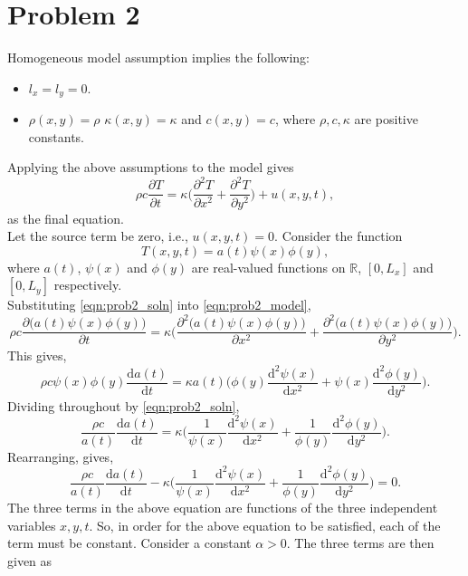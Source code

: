 \documentclass[12pt]{article}
\newcommand{\parder}[2]{\frac{\partial #1}{\partial #2}}
\newcommand{\der}[2]{\frac{\mathrm{d} #1}{\mathrm{d} #2}}
\begin{document}
\section*{Problem 2}
Homogeneous model assumption implies the following:
\begin{itemize}
	\item $l_x = l_y = 0$.
	\item $\rho(x,y) = \rho$ $\kappa(x,y) = \kappa$ and $c(x,y) = c$, where $\rho, c, \kappa$ are positive constants.
\end{itemize}
Applying the above assumptions to the model gives
\begin{equation}
\rho c \parder{T}{t} = \kappa \bigg(\parder{^2 T}{x^2} + \parder{^2 T}{y^2}\bigg) + u(x,y,t),
\label{eqn:prob2_model}
\end{equation}
as the final equation. \\
Let the source term be zero, i.e., $u(x,y,t) = 0$. Consider the function 
\begin{equation}
T(x,y,t) = a(t)\psi(x)\phi(y),
\label{eqn:prob2_soln}
\end{equation}
where $a(t)$, $\psi(x)$ and $\phi(y)$ are real-valued functions on $\mathbb{R}$, $[0,L_x]$ and $[0,L_y]$ respectively. \\
Substituting \eqref{eqn:prob2_soln} into \eqref{eqn:prob2_model},
\begin{equation}
\rho c \parder{\big(a(t)\psi(x)\phi(y)\big)}{t} = \kappa \bigg(\parder{^2 \big(a(t)\psi(x)\phi(y)\big)}{x^2} + \parder{^2 \big(a(t)\psi(x)\phi(y)\big)}{y^2}\bigg).
\end{equation}
This gives,   
\begin{equation}
\rho c \psi(x) \phi(y) \der{a(t)}{t} = \kappa a(t)\bigg(\phi(y)\der{^2 \psi(x)}{x^2} + \psi(x)\der{^2 \phi(y)}{y^2}\bigg).
\end{equation}
Dividing throughout by \eqref{eqn:prob2_soln}, 
\begin{equation}
\frac{\rho c}{a(t)} \der{a(t)}{t} = \kappa \bigg(\frac{1}{\psi(x)}\der{^2 \psi(x)}{x^2} + \frac{1}{\phi(y)}\der{^2 \phi(y)}{y^2}\bigg).
\end{equation}
Rearranging, gives,
\begin{equation}
\frac{\rho c}{a(t)} \der{a(t)}{t} - \kappa \bigg(\frac{1}{\psi(x)}\der{^2 \psi(x)}{x^2} + \frac{1}{\phi(y)}\der{^2 \phi(y)}{y^2}\bigg) = 0.
\end{equation}
The three terms in the above equation are functions of the three independent variables $x, y, t$. So, in order for the above equation to be satisfied, each of the term must be constant. Consider a constant $\alpha > 0$. The three terms are then given as
\end{document}

